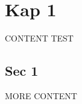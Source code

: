 \newcommand{\customDir}{../}








%



\maketitle
\newpage
\tableofcontents
\newpage

\chapter{Kap 1}
CONTENT
\HRule
TEST
\HDRule

\section{Sec 1}


\newpage

MORE CONTENT


